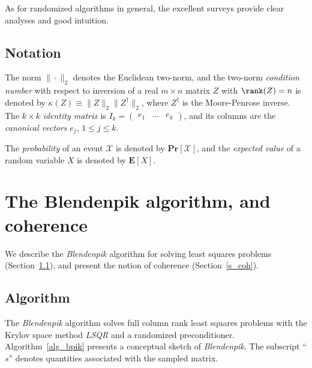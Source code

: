 \documentclass{siamltex}
\begin{document}
As for randomized algorithms in general, the excellent surveys
\cite{HMT09,Mah11} provide clear analyses and good intuition.

\subsection{Notation}
The norm $\|\cdot\|_2$ denotes the Euclidean two-norm, 
and the two-norm \textit{condition number} with respect to inversion
of a real $m\times n$ matrix $Z$ with $\rank(Z)=n$ is denoted by
$\kappa(Z)\equiv\|Z\|_2\|Z^{\dagger}\|_2$, where $Z^{\dagger}$ is the
Moore-Penrose inverse.
The $k\times k$ \textit{identity matrix} is 
$I_k=\begin{pmatrix}e_1 &\ldots &e_k\end{pmatrix}$, and its columns are
the \textit{canonical vectors} $e_j$, $1\leq j\leq k$.

The \textit{probability} of an event $\mathcal{X}$ is denoted by
${\mathbf{Pr}}[\mathcal{X}]$, and the \textit{expected value} of a random
variable $X$ is denoted by ${\mathbf{E}}[X]$.

 

\section{The Blendenpik algorithm, and coherence}\label{s_bpik}
We describe the \textsl{Blendenpik} algorithm 
for solving least squares problems (Section~\ref{s_bpikalg}), and
present the notion of coherence (Section~\ref{s_coh}).
 
\subsection{Algorithm}\label{s_bpikalg}
The \textsl{Blendenpik} algorithm \cite[Algorithm 1]{AMTol10} solves
full column rank least squares problems with the Krylov space
method \textsl{LSQR} \cite{PS82} and a randomized preconditioner.
Algorithm~\ref{alg_bpik} presents a conceptual sketch of
\textsl{Blendenpik}. The subscript ``$s$'' denotes quantities
associated with the sampled matrix.
\end{document}
